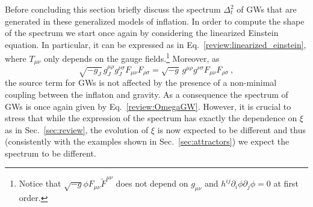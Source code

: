 Before concluding this section briefly discuss the spectrum $\Delta_t^2$ of GWs that are generated in these generalized models of inflation. In order to compute the shape of the spectrum we  start once again by considering the linearized Einstein equation. In particular, it can be expressed as in Eq.~\eqref{review:linearized_einstein}, where $T_{\mu\nu}$ only depends on the gauge fields.\footnote{Notice that $\sqrt{-g} \phi F_{\mu \nu} \tilde{F}^{\mu \nu} $ does not depend on $g_{\mu \nu}$ and $h^{ij}\partial_i \phi \partial_j \phi = 0$ at first order.} Moreover, as \begin{equation}
 \sqrt{-g_J} \, g_J^{\mu \rho} g_J^{\nu \sigma} F_{\mu \nu} F_{\rho \sigma} = \sqrt{-g} \, g^{\mu \rho} g^{\nu \sigma} F_{\mu \nu} F_{\rho \sigma}  \ , 
\end{equation}
the source term for GWs is not affected by the presence of a non-minimal coupling between the inflaton and gravity. As a consequence the spectrum of GWs is once again given by Eq.~\eqref{review:OmegaGW}. However, it is crucial to stress that while the expression of the spectrum has exactly the dependence on $\xi$ as in Sec.~\ref{sec:review}, the evolution of $\xi$ is now expected to be different and thus (consistently with the examples shown in Sec.~\ref{sec:attractors}) we expect the spectrum to be different.